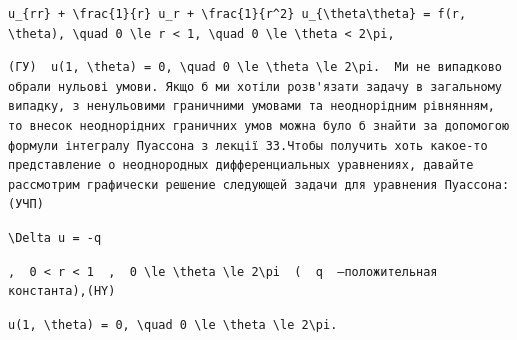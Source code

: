 \documentclass[
  ukrainian,
]{article}
\begin{document}
\begin{verbatim}
u_{rr} + \frac{1}{r} u_r + \frac{1}{r^2} u_{\theta\theta} = f(r, \theta), \quad 0 \le r < 1, \quad 0 \le \theta < 2\pi,
\end{verbatim}

\begin{verbatim}
(ГУ)  u(1, \theta) = 0, \quad 0 \le \theta \le 2\pi.  Ми не випадково обрали нульові умови. Якщо б ми хотіли розв'язати задачу в загальному випадку, з ненульовими граничними умовами та неоднорідним рівнянням, то внесок неоднорідних граничних умов можна було б знайти за допомогою формули інтегралу Пуассона з лекції 33.Чтобы получить хоть какое-то представление о неоднородных дифференциальных уравнениях, давайте рассмотрим графически решение следующей задачи для уравнения Пуассона:(УЧП)
\end{verbatim}

\begin{verbatim}
\Delta u = -q
\end{verbatim}

\begin{verbatim}
,  0 < r < 1  ,  0 \le \theta \le 2\pi  (  q  —положительная константа),(HY)
\end{verbatim}

\begin{verbatim}
u(1, \theta) = 0, \quad 0 \le \theta \le 2\pi.
\end{verbatim}
\end{document}
